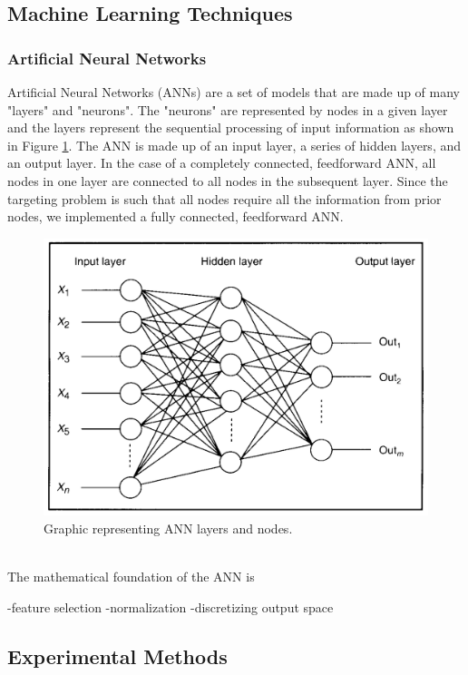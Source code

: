 \documentclass[11pt,letterpaper]{article}
\begin{document}
\subsection{Machine Learning Techniques}
\subsubsection{Artificial Neural Networks}
Artificial Neural Networks (ANNs) are a set of models that are made up of many "layers" and "neurons". The "neurons" are represented by nodes in a given layer and the layers represent the sequential processing of input information as shown in Figure \ref{fig:NN}. The ANN is made up of an input layer, a series of hidden layers, and an output layer. In the case of a completely connected, feedforward ANN, all nodes in one layer are connected to all nodes in the subsequent layer. Since the targeting problem is such that all nodes require all the information from prior nodes, we implemented a fully connected, feedforward ANN.
\begin{figure}[h]
	\centering
	\includegraphics[scale = 0.8]{NN.png}
	\caption{Graphic representing ANN layers and nodes.}
	\label{fig:NN}
\end{figure}\\

The mathematical foundation of the ANN is  


-feature selection
-normalization
-discretizing output space

\subsection{Experimental Methods}
\end{document}
